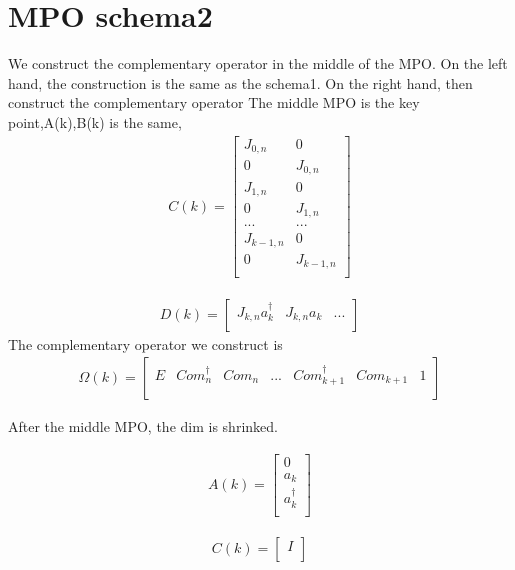\documentclass[a4paper,11pt]{ctexart}
\begin{document}
\section{MPO schema2}
We construct the complementary operator in the middle of the MPO.
On the left hand, the construction is the same as the schema1.
On the right hand, then construct the complementary operator
The middle MPO is the key point,A(k),B(k) is the same,
\begin{gather}
C(k) = 
\begin{bmatrix}
    J_{0,n}   &  0         \\
    0         &  J_{0,n}   \\
    J_{1,n}   &  0         \\
    0         &  J_{1,n}   \\
    ...       &  ...       \\
    J_{k-1,n} &  0         \\
    0         &  J_{k-1,n} \\
\end{bmatrix}
\end{gather}

\begin{gather}
D(k) = 
\begin{bmatrix}
    J_{k,n}a^\dagger_k  & J_{k,n}a_k & ... \\ 
\end{bmatrix}
\end{gather}
The complementary operator we construct is
\begin{gather}
\Omega(k) = 
\begin{bmatrix}
    E & Com_n^\dagger & Com_n & ... & Com_{k+1}^\dagger & Com_{k+1} & 1\\ 
\end{bmatrix}
\end{gather}

After the middle MPO, the dim is shrinked.

\begin{gather}
A(k) = 
\begin{bmatrix}
    0 \\
    a_k  \\
    a^\dagger_k \\
\end{bmatrix}
\end{gather}

\begin{gather}
C(k) = 
\begin{bmatrix}
    I  \\
\end{bmatrix}
\end{gather}
\end{document}
